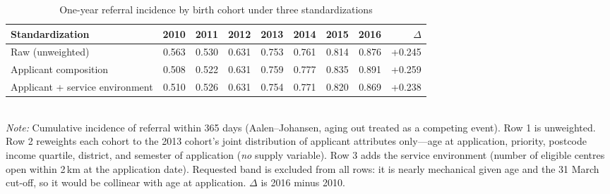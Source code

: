 \begin{table}[htbp]\centering
\caption{One-year referral incidence by birth cohort under three standardizations}
\label{tab:P3series}
\footnotesize
\setlength{\tabcolsep}{4pt}
\begin{tabular}{lrrrrrrrr}
\toprule
Standardization & 2010 & 2011 & 2012 & 2013 & 2014 & 2015 & 2016 & $\Delta$ \\
\midrule
Raw (unweighted) & 0.563 & 0.530 & 0.631 & 0.753 & 0.761 & 0.814 & 0.876 & +0.245 \\
Applicant composition & 0.508 & 0.522 & 0.631 & 0.759 & 0.777 & 0.835 & 0.891 & +0.259 \\
Applicant + service environment & 0.510 & 0.526 & 0.631 & 0.754 & 0.771 & 0.820 & 0.869 & +0.238 \\
\bottomrule
\end{tabular}
\\[3pt]{\footnotesize \textit{Note:} Cumulative incidence of referral within 365 days (Aalen--Johansen, aging out treated as a competing event). Row 1 is unweighted. Row 2 reweights each cohort to the 2013 cohort's joint distribution of applicant attributes only---age at application, priority, postcode income quartile, district, and semester of application (\emph{no} supply variable). Row 3 adds the service environment (number of eligible centres open within 2\,km at the application date). Requested band is excluded from all rows: it is nearly mechanical given age and the 31 March cut-off, so it would be collinear with age at application. $\Delta$ is 2016 minus 2010.}
\end{table}
